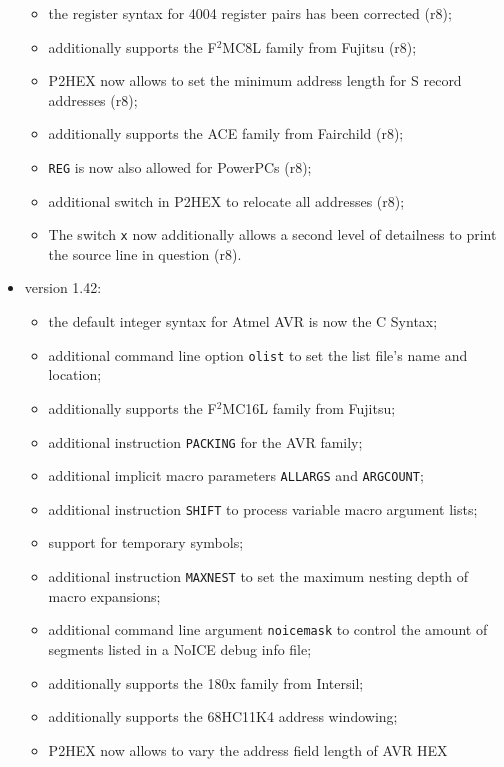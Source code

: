 \documentclass[12pt,twoside]{report}
\newcommand{\tty}[1]{{\tt #1}}
\begin{document}
\begin{itemize}
{\begin{itemize}
      \item{the register syntax for 4004 register pairs has been corrected
            (r8);}
      \item{additionally supports the F$^{2}$MC8L family from Fujitsu
            (r8);}
      \item{P2HEX now allows to set the minimum address length for S
            record addresses (r8);}
      \item{additionally supports the ACE family from Fairchild (r8);}
      \item{{\tt REG} is now also allowed for PowerPCs (r8);}
      \item{additional switch in P2HEX to relocate all addresses (r8);}
      \item{The switch \tty{x} now additionally allows a second level
            of detailness to print the source line in question (r8).}
      \end{itemize}}
\item{version 1.42:
      \begin{itemize}
      \item{the default integer syntax for Atmel AVR is now the C Syntax;}
      \item{additional command line option {\tt olist} to set the
            list file's name and location;}
      \item{additionally supports the F$^{2}$MC16L family from Fujitsu;}
      \item{additional instruction {\tt PACKING} for the AVR family;}
      \item{additional implicit macro parameters {\tt ALLARGS} and
            {\tt ARGCOUNT};}
      \item{additional instruction {\tt SHIFT} to process variable macro
            argument lists;}
      \item{support for temporary symbols;}
      \item{additional instruction {\tt MAXNEST} to set the maximum
            nesting depth of macro expansions;}
      \item{additional command line argument {\tt noicemask} to control
            the amount of segments listed in a NoICE debug info file;}
      \item{additionally supports the 180x family from Intersil;}
      \item{additionally supports the 68HC11K4 address windowing;}
      \item{P2HEX now allows to vary the address field length of AVR HEX
}
\end{itemize}}
\end{itemize}
\end{document}
